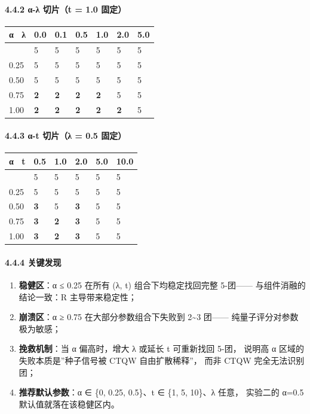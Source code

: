 \documentclass[
  11pt,
]{ctexart}
\newcounter{none} %
\providecommand{\tightlist}{%
  \setlength{\itemsep}{0pt}\setlength{\parskip}{0pt}}
\begin{document}
\paragraph{4.4.2 α-λ 切片（t = 1.0
固定）}\label{ux3b1-ux3bb-ux5207ux7247t-1.0-ux56faux5b9a}

{\def\LTcaptype{none} %
\begin{longtable}[]{@{}lllllll@{}}
\toprule\noalign{}
α ~λ & 0.0 & 0.1 & 0.5 & 1.0 & 2.0 & 5.0 \\
\midrule\noalign{}
\endhead
\bottomrule\noalign{}
\endlastfoot
0.00 & 5 & 5 & 5 & 5 & 5 & 5 \\
0.25 & 5 & 5 & 5 & 5 & 5 & 5 \\
0.50 & 5 & 5 & 5 & 5 & 5 & 5 \\
0.75 & \textbf{2} & \textbf{2} & \textbf{2} & \textbf{2} & 5 & 5 \\
1.00 & \textbf{2} & \textbf{2} & \textbf{2} & \textbf{2} & \textbf{2} &
5 \\
\end{longtable}
}

\paragraph{4.4.3 α-t 切片（λ = 0.5
固定）}\label{ux3b1-t-ux5207ux7247ux3bb-0.5-ux56faux5b9a}

{\def\LTcaptype{none} %
\begin{longtable}[]{@{}llllll@{}}
\toprule\noalign{}
α ~t & 0.5 & 1.0 & 2.0 & 5.0 & 10.0 \\
\midrule\noalign{}
\endhead
\bottomrule\noalign{}
\endlastfoot
0.00 & 5 & 5 & 5 & 5 & 5 \\
0.25 & 5 & 5 & 5 & 5 & 5 \\
0.50 & \textbf{3} & 5 & \textbf{3} & 5 & 5 \\
0.75 & \textbf{3} & \textbf{2} & \textbf{3} & 5 & 5 \\
1.00 & \textbf{3} & \textbf{2} & \textbf{3} & 5 & 5 \\
\end{longtable}
}

\paragraph{4.4.4 关键发现}\label{ux5173ux952eux53d1ux73b0-1}

\begin{enumerate}
\def\labelenumi{\arabic{enumi}.}
\tightlist
\item
  \textbf{稳健区}：α ≤ 0.25 在所有 (λ, t) 组合下均稳定找回完整
  5-团------ 与组件消融的结论一致：R 主导带来稳定性；
\item
  \textbf{崩溃区}：α ≥ 0.75 在大部分参数组合下失败到 2\textasciitilde3
  团------ 纯量子评分对参数极为敏感；
\item
  \textbf{挽救机制}：当 α 偏高时，增大 λ 或延长 t 可重新找回 5-团，
  说明高 α 区域的失败本质是''种子信号被 CTQW 自由扩散稀释''， 而非 CTQW
  完全无法识别团；
\item
  \textbf{推荐默认参数}：α ∈ \{0, 0.25, 0.5\}、t ∈ \{1, 5, 10\}、λ
  任意， 实验二的 α=0.5 默认值就落在该稳健区内。
\end{enumerate}
\end{document}

